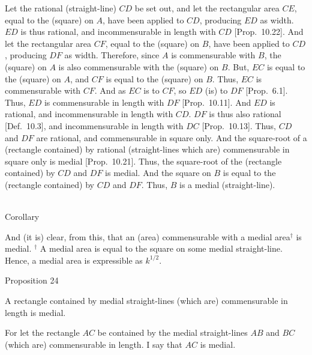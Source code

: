 Let the rational (straight-line) $CD$ be set out, and let the rectangular
area $CE$, equal to the (square) on $A$, have been applied to $CD$,
producing $ED$ as width. $ED$ is thus rational, and incommensurable
in length with $CD$ [Prop.~10.22]. And
let the rectangular area $CF$, equal to the (square) on $B$, have been
applied to $CD$, producing $DF$ as width.
Therefore, since $A$ is commensurable with $B$, the (square) on $A$
is also commensurable with the (square) on $B$.  But, $EC$ is equal
to the (square) on $A$, and $CF$ is equal to the (square) on $B$. Thus,
$EC$ is commensurable with $CF$. And as $EC$ is to $CF$, so $ED$ (is)
to $DF$ [Prop.~6.1]. Thus, $ED$ is commensurable
in  length with $DF$ [Prop.~10.11]. And $ED$
is rational, and incommensurable in length with $CD$.  $DF$ is thus
 also rational [Def.~10.3], and incommensurable in length with $DC$  [Prop.~10.13]. Thus,
 $CD$ and $DF$ are rational, and commensurable in square only.
 And the square-root of a (rectangle contained) by rational (straight-lines which are)
 commensurable in square only is medial [Prop.~10.21]. Thus, the square-root of the
 (rectangle contained) by $CD$ and $DF$ is medial.
 And the square on $B$ is equal to
 the (rectangle contained) by $CD$ and $DF$. Thus, $B$ is a medial (straight-line).
 
\epsfysize=2.1in
\centerline{}
 
\begin{center}~\\
 {\large Corollary}
 \end{center}\vspace*{-7pt}
 
 And (it is) clear, from this, that an (area) commensurable with a medial 
 area$^\dag$ is medial.
{\footnotesize\noindent$^\dag$ A medial area is equal to the square on some medial straight-line. Hence, a medial area is expressible as $k^{1/2}$.}
 

\begin{center}
{\large Proposition 24}
\end{center}

A rectangle contained by medial straight-lines
(which are) commensurable in length is medial.

For let the rectangle $AC$ be contained by the medial straight-lines
$AB$ and $BC$ (which are) commensurable in length. I say that $AC$
is medial.


